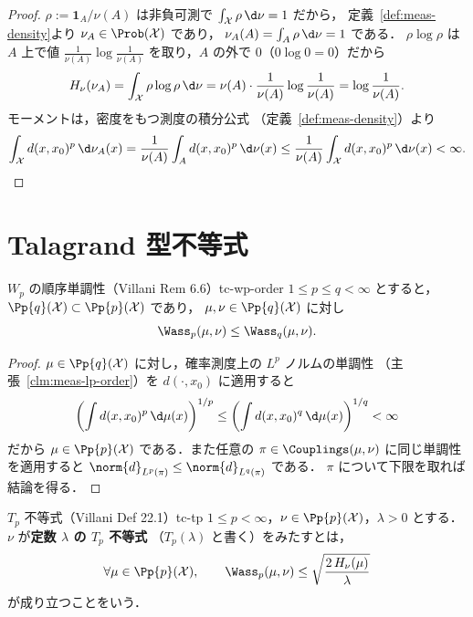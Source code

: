 \begin{proof}
  $\rho:=\mathbf{1}_A/\nu(A)$ は非負可測で
  $\int_{\mathcal{X}}\rho\,\d\nu=1$ だから，
  定義~\ref{def:meas-density}より $\nu_A\in\Prob(\mathcal{X})$ であり，
  $\nu_A(A)=\int_A\rho\,\d\nu=1$ である．
  $\rho\log\rho$ は $A$ 上で値
  $\frac{1}{\nu(A)}\log\frac{1}{\nu(A)}$ を取り，$A$ の外で
  $0$（$0\log0=0$）だから
  \[
    H_\nu(\nu_A)
    =\int_{\mathcal{X}}\rho\log\rho\,\d\nu
    =\nu(A)\cdot\frac{1}{\nu(A)}\log\frac{1}{\nu(A)}
    =\log\frac{1}{\nu(A)}.
  \]
  モーメントは，密度をもつ測度の積分公式
  （定義~\ref{def:meas-density}）より
  \[
    \int_{\mathcal{X}}d(x,x_0)^p\,\d\nu_A(x)
    =\frac{1}{\nu(A)}\int_Ad(x,x_0)^p\,\d\nu(x)
    \leq\frac{1}{\nu(A)}\int_{\mathcal{X}}d(x,x_0)^p\,\d\nu(x)
    <\infty.  \qedhere
  \]
\end{proof}

\section{Talagrand 型不等式}
\label{sec:tc-tp}

\begin{lemma}{$W_p$ の順序単調性（Villani Rem 6.6）}{tc-wp-order}
  $1\leq p\leq q<\infty$ とすると，
  $\Pp{q}(\mathcal{X})\subset\Pp{p}(\mathcal{X})$ であり，
  $\mu,\nu\in\Pp{q}(\mathcal{X})$ に対し
  \[
    \Wass_p(\mu,\nu)\leq\Wass_q(\mu,\nu).
  \]
\end{lemma}

\begin{proof}
  $\mu\in\Pp{q}(\mathcal{X})$ に対し，確率測度上の $L^p$ ノルムの単調性
  （主張~\ref{clm:meas-lp-order}）を $d(\cdot,x_0)$ に適用すると
  \[
    \left(\int d(x,x_0)^p\,\d\mu(x)\right)^{1/p}
    \leq
    \left(\int d(x,x_0)^q\,\d\mu(x)\right)^{1/q}<\infty
  \]
  だから $\mu\in\Pp{p}(\mathcal{X})$ である．また任意の
  $\pi\in\Couplings(\mu,\nu)$ に同じ単調性を適用すると
  $\norm{d}_{L^p(\pi)}\leq\norm{d}_{L^q(\pi)}$ である．
  $\pi$ について下限を取れば結論を得る．
\end{proof}

\begin{definition}{$T_p$ 不等式（Villani Def 22.1）}{tc-tp}
  $1\leq p<\infty$，$\nu\in\Pp{p}(\mathcal{X})$，$\lambda>0$ とする．
  $\nu$ が\textbf{定数 $\lambda$ の $T_p$ 不等式}
  （$T_p(\lambda)$ と書く）をみたすとは，
  \[
    \forall\mu\in\Pp{p}(\mathcal{X}),\qquad
    \Wass_p(\mu,\nu)\leq\sqrt{\frac{2\,H_\nu(\mu)}{\lambda}}
  \]
  が成り立つことをいう．
\end{definition}

